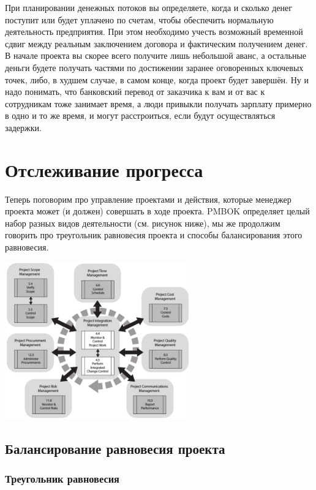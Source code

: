 \documentclass{../../text-style}
\begin{document}
При планировании денежных потоков вы определяете, когда и сколько денег поступит или будет уплачено по счетам, чтобы обеспечить нормальную деятельность предприятия. При этом необходимо учесть возможный временной сдвиг между реальным заключением договора и фактическим получением денег. В начале проекта вы скорее всего получите лишь небольшой аванс, а остальные деньги будете получать частями по достижении заранее оговоренных ключевых точек, либо, в худшем случае, в самом конце, когда проект будет завершён. Ну и надо понимать, что банковский перевод от заказчика к вам и от вас к сотрудникам тоже занимает время, а люди привыкли получать зарплату примерно в одно и то же время, и могут расстроиться, если будут осуществляться задержки.

\section{Отслеживание прогресса}

Теперь поговорим про управление проектами и действия, которые менеджер проекта может (и должен) совершать в ходе проекта. PMBOK определяет целый набор разных видов деятельности (см. рисунок ниже), мы же продолжим говорить про треугольник равновесия проекта и способы балансирования этого равновесия.

\begin{center}
    \includegraphics[width=0.6\textwidth]{pmbokProjectManagement.png}
\end{center}

\subsection{Балансирование равновесия проекта}

\subsubsection{Треугольник равновесия}
\end{document}
